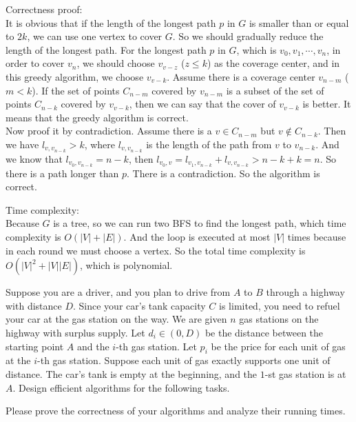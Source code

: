 \documentclass{oxmathproblems}
\begin{document}
\begin{questions}
Correctness proof:\\
It is obvious that if the length of the longest path $p$ in $G$ is smaller than or equal to $2k$, we can use one vertex to cover $G$. So we should gradually reduce the length of the longest path.
For the longest path $p$ in $G$, which is $v_0, v_1, \cdots, v_n$, in order to cover $v_n$, we should choose $v_{v-z}$ ($z \leq k$) as the coverage center, and in this greedy algorithm, we choose $v_{v-k}$.
Assume there is a coverage center $v_{n-m}$ ($m < k$). If the set of points $C_{n-m}$ covered by $v_{n-m}$ is a subset of the set of points $C_{n-k}$ covered by $v_{v-k}$, then we can say that the cover of $v_{v-k}$ is better. It means that the greedy algorithm is correct.\\
Now proof it by contradiction. Assume there is a $v \in C_{n-m}$ but $v \notin C_{n-k}$. Then we have $l_{v, v_{n-k}} > k$, where $l_{v, v_{n-k}}$ is the length of the path from $v$ to $v_{n-k}$.
And we know that $l_{v_0, v_{n-k}} = n - k$, then $l_{v_0, v} = l_{v_1, v_{n-k}} + l_{v, v_{n-k}} > n - k + k = n$. So there is a path longer than $p$. There is a contradiction. So the algorithm is correct.

Time complexity:\\
Because $G$ is a tree, so we can run two BFS to find the longest path, which time complexity is $O(|V|+|E|)$. And the loop is executed at most $|V|$ times because in each round we must choose a vertex. So the total time complexity is $O(|V|^2+|V||E|)$, which is polynomial.


\miquestion[25]
Suppose you are a driver, and you plan to drive from $A$ to $B$ through a highway with distance $D$. 
Since your car's tank capacity $C$ is limited, you need to refuel your car at the gas station on the way. 
We are given $n$ gas stations on the highway with surplus supply. 
Let $d_i\in(0,D)$ be the distance between the starting point $A$ and the $i$-th gas station.
Let $p_i$ be the price for each unit of gas at the $i$-th gas station.
Suppose each unit of gas exactly supports one unit of distance. 
The car's tank is empty at the beginning, and the $1$-st gas station is at $A$. 
Design efficient algorithms for the following tasks.
Please prove the correctness of your algorithms and analyze their running times.


\end{questions}
\end{document}
